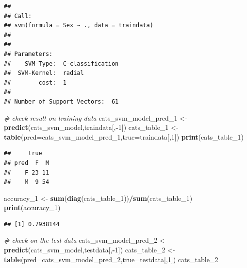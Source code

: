 \documentclass[
]{article}
\newenvironment{Shaded}{\begin{snugshade}}{\end{snugshade}}
\newcommand{\CommentTok}[1]{\textcolor[rgb]{0.56,0.35,0.01}{\textit{#1}}}
\newcommand{\DataTypeTok}[1]{\textcolor[rgb]{0.13,0.29,0.53}{#1}}
\newcommand{\DecValTok}[1]{\textcolor[rgb]{0.00,0.00,0.81}{#1}}
\newcommand{\KeywordTok}[1]{\textcolor[rgb]{0.13,0.29,0.53}{\textbf{#1}}}
\newcommand{\NormalTok}[1]{#1}
\newcommand{\OperatorTok}[1]{\textcolor[rgb]{0.81,0.36,0.00}{\textbf{#1}}}
\newcommand{\StringTok}[1]{\textcolor[rgb]{0.31,0.60,0.02}{#1}}
\begin{document}
\begin{verbatim}
## 
## Call:
## svm(formula = Sex ~ ., data = traindata)
## 
## 
## Parameters:
##    SVM-Type:  C-classification 
##  SVM-Kernel:  radial 
##        cost:  1 
## 
## Number of Support Vectors:  61
\end{verbatim}

\begin{Shaded}
\begin{Highlighting}[]
\CommentTok{# check result on training data}
\NormalTok{cats_svm_model_pred_}\DecValTok{1}\NormalTok{ <-}\StringTok{ }\KeywordTok{predict}\NormalTok{(cats_svm_model,traindata[,}\OperatorTok{-}\DecValTok{1}\NormalTok{])}
\NormalTok{cats_table_}\DecValTok{1}\NormalTok{ <-}\StringTok{ }\KeywordTok{table}\NormalTok{(}\DataTypeTok{pred=}\NormalTok{cats_svm_model_pred_}\DecValTok{1}\NormalTok{,}\DataTypeTok{true=}\NormalTok{traindata[,}\DecValTok{1}\NormalTok{])}
\KeywordTok{print}\NormalTok{(cats_table_}\DecValTok{1}\NormalTok{)}
\end{Highlighting}
\end{Shaded}

\begin{verbatim}
##     true
## pred  F  M
##    F 23 11
##    M  9 54
\end{verbatim}

\begin{Shaded}
\begin{Highlighting}[]
\NormalTok{accuracy_}\DecValTok{1}\NormalTok{ <-}\StringTok{ }\KeywordTok{sum}\NormalTok{(}\KeywordTok{diag}\NormalTok{(cats_table_}\DecValTok{1}\NormalTok{))}\OperatorTok{/}\KeywordTok{sum}\NormalTok{(cats_table_}\DecValTok{1}\NormalTok{)}
\KeywordTok{print}\NormalTok{(accuracy_}\DecValTok{1}\NormalTok{)}
\end{Highlighting}
\end{Shaded}

\begin{verbatim}
## [1] 0.7938144
\end{verbatim}

\begin{Shaded}
\begin{Highlighting}[]
\CommentTok{# check on the test data}
\NormalTok{cats_svm_model_pred_}\DecValTok{2}\NormalTok{ <-}\StringTok{ }\KeywordTok{predict}\NormalTok{(cats_svm_model,testdata[,}\OperatorTok{-}\DecValTok{1}\NormalTok{])}
\NormalTok{cats_table_}\DecValTok{2}\NormalTok{ <-}\StringTok{ }\KeywordTok{table}\NormalTok{(}\DataTypeTok{pred=}\NormalTok{cats_svm_model_pred_}\DecValTok{2}\NormalTok{,}\DataTypeTok{true=}\NormalTok{testdata[,}\DecValTok{1}\NormalTok{])}
\NormalTok{cats_table_}\DecValTok{2}
\end{Highlighting}
\end{Shaded}
\end{document}
